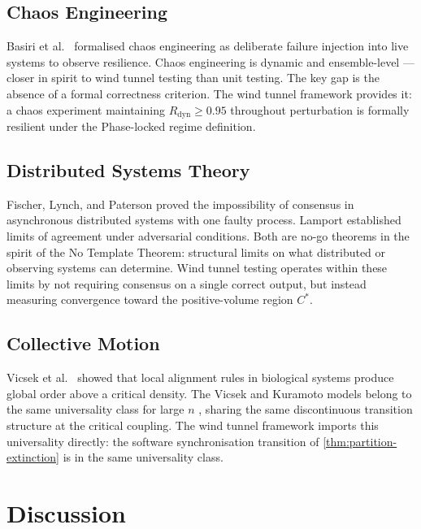 \documentclass[twocolumn,a4paper,11pt]{article}
\theoremstyle{plain}
\theoremstyle{definition}
\theoremstyle{remark}
\begin{document}
\subsection{Chaos Engineering}

Basiri et al.\ \cite{basiri2016} formalised chaos engineering as
deliberate failure injection into live systems to observe resilience.
Chaos engineering is dynamic and ensemble-level --- closer in spirit to
wind tunnel testing than unit testing. The key gap is the absence of a
formal correctness criterion. The wind tunnel framework provides it: a
chaos experiment maintaining $R_\mathrm{dyn} \geq 0.95$ throughout
perturbation is formally resilient under the Phase-locked regime
definition.

\subsection{Distributed Systems Theory}

Fischer, Lynch, and Paterson \cite{flp1985} proved the impossibility of
consensus in asynchronous distributed systems with one faulty process.
Lamport \cite{lamport1982} established limits of agreement under
adversarial conditions. Both are no-go theorems in the spirit of the
No Template Theorem: structural limits on what distributed or observing
systems can determine. Wind tunnel testing operates within these limits
by not requiring consensus on a single correct output, but instead
measuring convergence toward the positive-volume region $C^*$.

\subsection{Collective Motion}

Vicsek et al.\ \cite{vicsek1995} showed that local alignment rules in
biological systems produce global order above a critical density. The
Vicsek and Kuramoto models belong to the same universality class for
large $n$ \cite{strogatz2000}, sharing the same discontinuous transition
structure at the critical coupling. The wind tunnel framework imports
this universality directly: the software synchronisation transition of
\cref{thm:partition-extinction} is in the same universality class.

\section{Discussion}
\label{sec:discussion}
\end{document}
